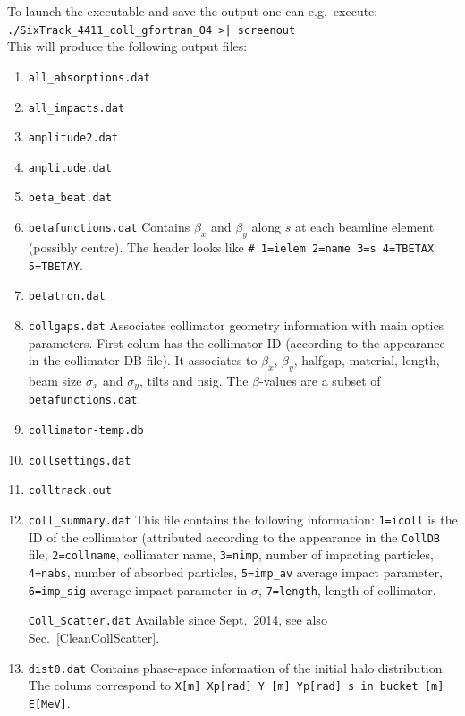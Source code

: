 \documentclass[a4paper, oneside, final]{scrartcl}
\begin{document}
{{To launch the executable and save the output one can e.g.~execute: \\
\texttt{./SixTrack\_4411\_coll\_gfortran\_O4 >| screenout} \\

This will produce the following output files:

\begin{enumerate}
\item \texttt{all\_absorptions.dat}
\item \texttt{all\_impacts.dat}
\item \texttt{amplitude2.dat}
\item \texttt{amplitude.dat}
\item \texttt{beta\_beat.dat}

\item \texttt{betafunctions.dat} Contains $\beta_x$ and $\beta_y$ along $s$ at each beamline element (possibly centre). The header looks like \texttt{\# 1=ielem 2=name 3=s 4=TBETAX 5=TBETAY}.

\item \texttt{betatron.dat}
\item \texttt{collgaps.dat} Associates collimator geometry information with main optics parameters. First colum has the collimator ID (according to the appearance in the collimator DB file). It associates to $\beta_x$, $\beta_y$, halfgap, material, length, beam size $\sigma_x$ and $\sigma_y$, tilts and nsig. The $\beta$-values are a subset of \texttt{betafunctions.dat}.

\item \texttt{collimator-temp.db}
\item \texttt{collsettings.dat}
\item \texttt{colltrack.out}

\item \texttt{coll\_summary.dat} This file contains the following information: \texttt{1=icoll} is the ID of the collimator (attributed according to the appearance in the \texttt{CollDB} file, \texttt{2=collname}, collimator name, \texttt{3=nimp}, number of impacting particles, \texttt{4=nabs}, number of absorbed particles, \texttt{5=imp\_av} average impact parameter, \texttt{6=imp\_sig} average impact parameter in $\sigma$, \texttt{7=length}, length of collimator.

\texttt{Coll\_Scatter.dat} Available since Sept.~2014, see also Sec.~\ref{CleanCollScatter}.
\item \texttt{dist0.dat} Contains phase-space information of the initial halo distribution. The colums correspond to \texttt{X[m]   Xp[rad]   Y [m]   Yp[rad]   s in bucket [m]  E[MeV]}.


\end{enumerate}}}
\end{document}
